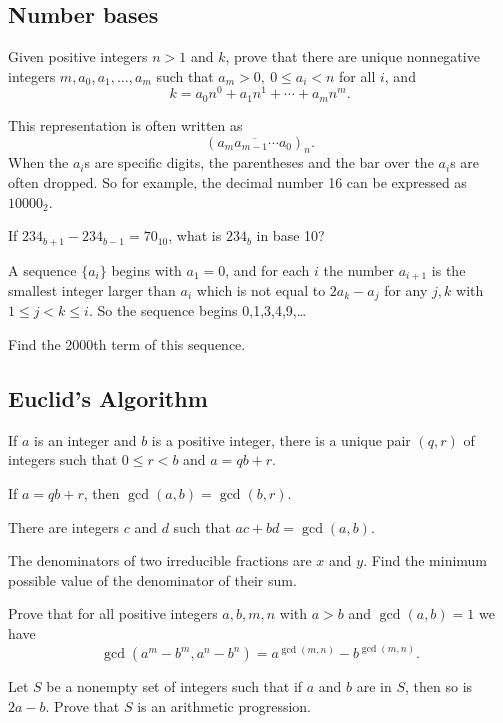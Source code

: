 \subsection{Number bases}\label{b:n:bases}
\begin{result}{\label{r:b:n:b:1}}
    Given positive integers $n>1$ and $k$, prove that there are unique
      nonnegative integers $m,a_0,a_1,\ldots,a_m$ such that $a_m>0,\ 0\le
      a_i<n$ for all $i$, and
      \[k=a_0 n^0+a_1 n^1+\cdots+a_m n^m.\]
\end{result}
This representation is often written as
\[(\overline{a_m a_{m-1}\cdots a_0})_n.\]
When the $a_i$s are specific digits, the parentheses and the bar over the $a_i$s
are often dropped. So for example, the decimal number 16 can be expressed as
$10000_2$.
\begin{problem}{\label{p:b:n:b:1}}
   If $234_{b+1}-234_{b-1}=70_{10}$, what is $234_b$ in base 10?
\end{problem}
\begin{problem}{\label{p:b:n:b:2}}
  A sequence $\{a_i\}$ begins with $a_1=0$, and for each $i$ the number
    $a_{i+1}$ is the smallest integer larger than $a_i$ which is not
    equal to $2a_k-a_j$ for any $j,k$ with $1\le j<k\le i$. So the sequence begins
    0,1,3,4,9,\ldots

    Find the 2000th term of this sequence.
\end{problem}
\subsection{Euclid's Algorithm}\label{b:n:euclid}
\begin{result}{\label{r:b:n:e:1}}
    If $a$ is an integer and $b$ is a positive integer, there
      is a unique pair $(q,r)$ of integers such that $0\le r<b$ and $a=qb+r$.
\end{result}
\begin{result}{\label{r:b:n:e:2}}
    If $a=qb+r$, then $\gcd(a,b)=\gcd(b,r)$.
\end{result}
\begin{result}{\label{r:b:n:e:3}}
    There are integers $c$ and $d$ such that $ac+bd=\gcd(a,b)$.
\end{result}
\begin{problem}{\label{p:b:n:e:1}}
    The denominators of two irreducible fractions are $x$ and $y$. Find the
    minimum possible value of the denominator of their sum.
\end{problem}
\begin{result}{\label{r:b:n:e:4}}
    Prove that for all positive integers $a,b,m,n$ with $a>b$ and $\gcd(a,b)=1$ we have
    \[\gcd(a^m-b^m,a^n-b^n)=a^{\gcd(m,n)}-b^{\gcd(m,n)}.\]
\end{result}
\begin{problem}{\label{p:b:n:e:2}}
    Let $S$ be a nonempty set of integers such that if $a$ and $b$ are in $S$, then
      so is $2a-b$. Prove that $S$ is an arithmetic progression.
\end{problem}
